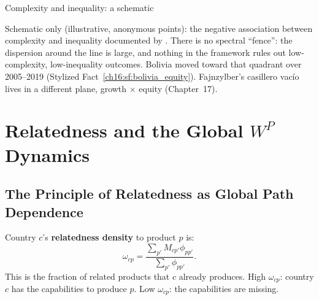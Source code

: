 \documentclass[../structural_economics_book.tex]{subfiles}
\begin{document}
\begin{vizpanel}{Complexity and inequality: a schematic}
\begin{center}
\end{center}
\vspace{-0.5em}
\small Schematic only (illustrative, anonymous points): the negative association between complexity and inequality documented by \citet{hartmann2017linking}. There is no spectral ``fence'': the dispersion around the line is large, and nothing in the framework rules out low-complexity, low-inequality outcomes. Bolivia moved toward that quadrant over 2005--2019 (Stylized Fact~\ref{ch16:sf:bolivia_equity}). Fajnzylber's casillero vac\'{i}o lives in a different plane, growth $\times$ equity (Chapter~17).
\end{vizpanel}


\section{Relatedness and the Global $W^P$ Dynamics}
\label{ch16:sec:relatedness}

\subsection{The Principle of Relatedness as Global Path Dependence}

\begin{definition}\label{ch16:def:relatedness}
Country $c$'s \textbf{relatedness density} to product $p$ is:
\begin{equation}\label{ch16:eq:relatedness}
\omega_{cp} = \frac{\sum_{p'} M_{cp'}\phi_{pp'}}{\sum_{p'}\phi_{pp'}}.
\end{equation}
This is the fraction of related products that $c$ already produces. High $\omega_{cp}$: country $c$ has the capabilities to produce $p$. Low $\omega_{cp}$: the capabilities are missing.
\end{definition}
\end{document}
